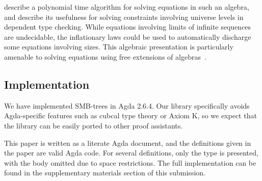  describe a polynomial time algorithm for solving equations in such an algebra,
and describe its usefulness for solving constraints involving universe levels
in dependent type checking. While equations involving limits of infinite sequences
are undecidable, the inflationary laws could be used to automatically discharge some equations involving sizes. This algebraic presentation is particularly
amenable to solving equations using free extensions of algebras~\citep{corbyn:proof-synthesis,allais2023frex}.


\subsection{Implementation}

We have implemented SMB-trees in Agda 2.6.4.
Our library specifically avoids Agda-specific features
such as cubcal type theory or Axiom K, so we expect
that the library can be easily ported to other proof assistants.

This paper is written as a literate Agda document, and the definitions
given in the paper are valid Agda code.
For several definitions, only the type is presented, with the body omitted due to
space restrictions. The full implementation can be found in the supplementary
materials section of this submission.
